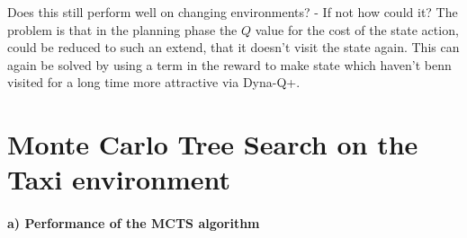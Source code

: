 \documentclass{article}
\begin{document}
Does this still perform well on changing environments? - If not how could it? The problem is that in the planning phase the $Q$ value for the cost of the state action, could be reduced to such an extend, that it doesn't visit the state again. This can again be solved by using a term in the reward to make state which haven't benn visited for a long time more attractive via Dyna-Q+.



\section{Monte Carlo Tree Search on the Taxi environment}

\paragraph{a) Performance of the MCTS algorithm}
\end{document}
